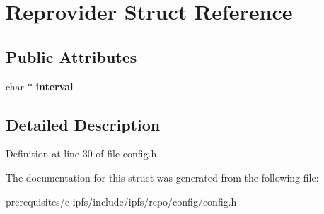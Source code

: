 \hypertarget{struct_reprovider}{}\section{Reprovider Struct Reference}
\label{struct_reprovider}
\subsection*{Public Attributes}
\begin{DoxyCompactItemize}
\item 
\mbox{\label{struct_reprovider_a6d82c4876fd10a69a1cda91f361c603f}} 
char $\ast$ {\bfseries interval}
\end{DoxyCompactItemize}


\subsection{Detailed Description}


Definition at line 30 of file config.\+h.



The documentation for this struct was generated from the following file\+:\begin{DoxyCompactItemize}
\item 
prerequisites/c-\/ipfs/include/ipfs/repo/config/config.\+h\end{DoxyCompactItemize}
